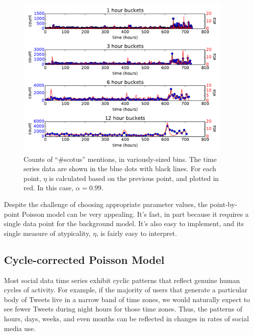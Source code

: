 \documentclass{article}
\begin{document}
\begin{figure}
\begin{center}
\includegraphics[width=0.95\textwidth]{fig/scotus_bucket_size.pdf}
\caption{Counts of ``\#scotus'' mentions, in variously-sized bins. The time
series data are shown in the blue dots with black lines. For each point, $\eta$ is
calculated based on the previous point, and plotted in red. In this case,
$\alpha = 0.99$.}
\label{fig:scotus2}
\end{center}
\end{figure}

Despite the challenge of choosing appropriate parameter values, the
point-by-point Poisson model can be very appealing. It's fast, in part
because it requires a single data point for the background model. It's also
easy to implement, and its single measure of atypicality, $\eta$, is fairly easy
to interpret. 

\subsection{Cycle-corrected Poisson Model}
\label{ccpm}

Most social data time series exhibit cyclic patterns that reflect genuine human
cycles of activity. For example, if the majority of users that generate a
particular body of Tweets live in a narrow band of time zones, we would
naturally expect to see fewer Tweets during night hours for those time zones.
Thus, the patterns of hours, days, weeks, and even months can be reflected in
changes in rates of social media use. 
\end{document}
